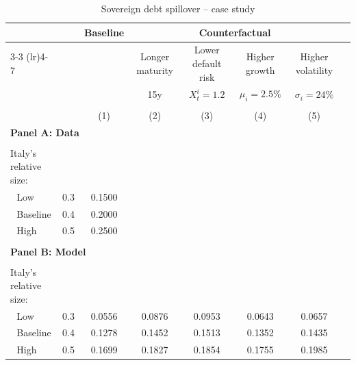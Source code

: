 \begin{table}[h]
\small
\centering
\caption{Sovereign debt spillover -- case study}
\label{tab:table_CPE_spillover}
\begin{tabular*}{\textwidth}{@{\extracolsep{\fill}}llcccccc}
\toprule
 & & \multicolumn{1}{c}{\textbf{Baseline}} & \multicolumn{4}{c}{\textbf{Counterfactual}} \\
\cmidrule(lr){3-3} \cmidrule(lr){4-7}
 & & \multicolumn{1}{c}{} & \multicolumn{1}{c}{Longer maturity} & \multicolumn{1}{c}{Lower default risk} & \multicolumn{1}{c}{Higher growth} & \multicolumn{1}{c}{Higher volatility} \\
 & & \multicolumn{1}{c}{} & \multicolumn{1}{c}{15y} & \multicolumn{1}{c}{$X^i_t = 1.2$} & \multicolumn{1}{c}{$\mu_i = 2.5\%$} & \multicolumn{1}{c}{$\sigma_i = 24\%$} \\
\\
& &  (1) & (2) & (3) & (4) &(5) \\
\multicolumn{7}{l}{\textbf{Panel A: Data}} \\
\midrule \\
Italy's relative size: & & & & & & \\
\,\, Low & 0.3 & 0.1500 & & & & \\
\,\, Baseline & 0.4 & 0.2000 & & & & \\
\,\, High & 0.5 & 0.2500 & & & & \\
\\
\multicolumn{7}{l}{\textbf{Panel B: Model}} \\
\midrule \\
Italy's relative size: & & & & & & \\
\,\, Low & 0.3 & 0.0556 & 0.0876 & 0.0953 & 0.0643 & 0.0657 \\
\,\, Baseline & 0.4 & 0.1278 & 0.1452 & 0.1513 & 0.1352 & 0.1435 \\
\,\, High & 0.5 & 0.1699 & 0.1827 & 0.1854 & 0.1755 & 0.1985 \\
\bottomrule
\end{tabular*}
\end{table}
